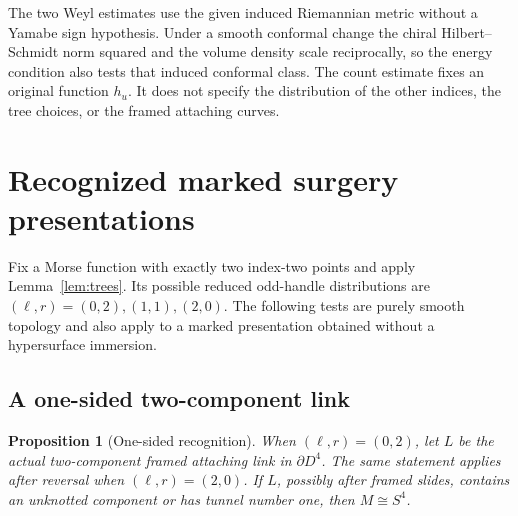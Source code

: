 \documentclass[11pt,letterpaper]{article}
\numberwithin{equation}{section}
\newtheorem{proposition}[theorem]{Proposition}
\begin{document}
The two Weyl estimates use the given induced Riemannian metric
without a Yamabe sign hypothesis. Under a smooth conformal change
the chiral Hilbert--Schmidt norm squared and the volume density
scale reciprocally, so the energy condition also tests that
induced conformal class. The count estimate fixes an original
function \(h_u\). It does not specify the distribution of the
other indices, the tree choices, or the framed attaching curves.

\section{Recognized marked surgery presentations}\label{sec:surgery}

Fix a Morse function with exactly two index-two points and apply
Lemma~\ref{lem:trees}. Its possible reduced odd-handle distributions
are \((\ell,r)=(0,2),(1,1),(2,0)\). The following tests are purely
smooth topology and also apply to a marked presentation obtained
without a hypersurface immersion.

\subsection{A one-sided two-component link}

\begin{proposition}[One-sided recognition]\label{prop:onesided}
When \((\ell,r)=(0,2)\), let \(L\) be the actual two-component
framed attaching link in \(\partial D^4\). The same statement
applies after reversal when \((\ell,r)=(2,0)\). If \(L\), possibly
after framed slides, contains an unknotted component or has tunnel
number one, then \(M\cong S^4\).
\end{proposition}
\end{document}
